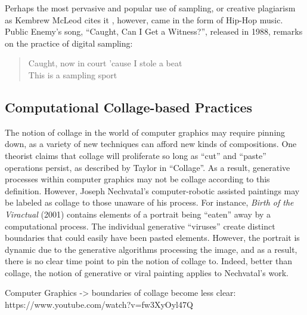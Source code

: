 Perhaps the most pervasive and popular use of sampling, or creative plagiarism as Kembrew McLeod cites it \cite{McLeod2011}, however, came in the form of Hip-Hop music.  Public Enemy's song, ``Caught, Can I Get a Witness?'', released in 1988, remarks on the practice of digital sampling: 
\begin{verse}
Caught, now in court 'cause I stole a beat\\
This is a sampling sport
\end{verse}


\subsection{Computational Collage-based Practices}

The notion of collage in the world of computer graphics may require pinning down, as a variety of new techniques can afford new kinds of compositions.  One theorist claims that collage will proliferate so long as ``cut'' and ``paste'' operations persist, as described by Taylor in ``Collage''.   As a result, generative processes within computer graphics may not be collage according to this definition.  However, Joseph Nechvatal's computer-robotic assisted paintings may be labeled as collage to those unaware of his process.  For instance, \textit{Birth of the Viractual} (2001) contains elements of a portrait being ``eaten'' away by a computational process.  The individual generative ``viruses'' create distinct boundaries that could easily have been pasted elements.  However, the portrait is dynamic due to the generative algorithms processing the image, and as a result, there is no clear time point to pin the notion of collage to.  Indeed, better than collage, the notion of generative or viral painting applies to Nechvatal's work. 

Computer Graphics -> boundaries of collage become less clear: https://www.youtube.com/watch?v=fw3XyOyl47Q


